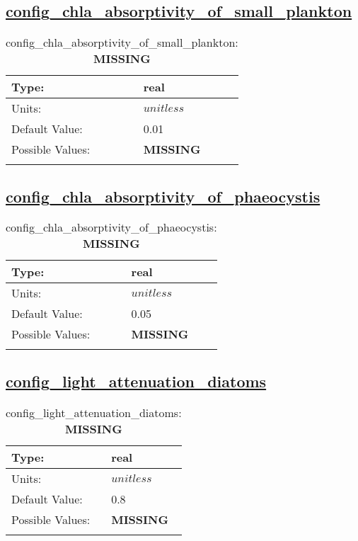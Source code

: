 \subsection[config\_chla\_absorptivity\_of\_small\_plankton]{\hyperref[sec:nm_tab_biogeochemistry]{config\_chla\_absorptivity\_of\_small\_plankton}}
\label{subsec:nm_sec_config_chla_absorptivity_of_small_plankton}
\begin{center}
\begin{longtable}{| p{2.0in} || p{4.0in} |}
    \hline
    Type: & real \\
    \hline
    Units: & $unitless$ \\
    \hline
    Default Value: & 0.01 \\
    \hline
    Possible Values: & {\bf \color{red} MISSING} \\
    \hline
    \caption{config\_chla\_absorptivity\_of\_small\_plankton: {\bf \color{red} MISSING}}
\end{longtable}
\end{center}
\subsection[config\_chla\_absorptivity\_of\_phaeocystis]{\hyperref[sec:nm_tab_biogeochemistry]{config\_chla\_absorptivity\_of\_phaeocystis}}
\label{subsec:nm_sec_config_chla_absorptivity_of_phaeocystis}
\begin{center}
\begin{longtable}{| p{2.0in} || p{4.0in} |}
    \hline
    Type: & real \\
    \hline
    Units: & $unitless$ \\
    \hline
    Default Value: & 0.05 \\
    \hline
    Possible Values: & {\bf \color{red} MISSING} \\
    \hline
    \caption{config\_chla\_absorptivity\_of\_phaeocystis: {\bf \color{red} MISSING}}
\end{longtable}
\end{center}
\subsection[config\_light\_attenuation\_diatoms]{\hyperref[sec:nm_tab_biogeochemistry]{config\_light\_attenuation\_diatoms}}
\label{subsec:nm_sec_config_light_attenuation_diatoms}
\begin{center}
\begin{longtable}{| p{2.0in} || p{4.0in} |}
    \hline
    Type: & real \\
    \hline
    Units: & $unitless$ \\
    \hline
    Default Value: & 0.8 \\
    \hline
    Possible Values: & {\bf \color{red} MISSING} \\
    \hline
    \caption{config\_light\_attenuation\_diatoms: {\bf \color{red} MISSING}}
\end{longtable}
\end{center}
